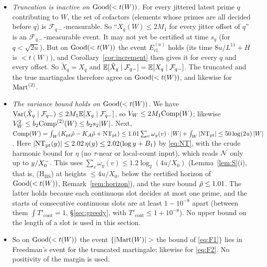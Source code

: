 \begin{itemize}
\item \emph{Truncation is inactive on $\mathrm{Good}(<t(W))$.} For every jittered latest prime $q$ contributing to $W$, the set of cofactors
  (elements whose primes are all decided before $q$) is $\mathcal F_{q-}$-measurable. So ``$X_q(W)\le2M_1$ for every jitter
  offset of $q$'' is an $\mathcal F_{q-}$-measurable event. It may not yet be certified at time $s_q$ (for $q<\sqrt{2u}$).
  But on $\mathrm{Good}(<t(W))$ the event $E_{\mathrm{cl}}^{(u)}$ holds (its time $8u/L^{11}+H$ is $<t(W)$), and
  Corollary~\ref{cor:increment} then gives it for every $q$ and every offset. So $\tilde X_q=X_q$ and
  $\mathbb{E}[\tilde X_q\mid\mathcal F_{q-}]=\mathbb{E}[X_q\mid\mathcal F_{q-}]$. The truncated and the true martingales therefore agree on
  $\mathrm{Good}(<t(W))$, and likewise for $\mathrm{Mart}^{(2)}$.
\item \emph{The variance bound holds on $\mathrm{Good}(<t(W))$.} We have
  $\mathrm{Var}(\tilde X_q\mid\mathcal F_{q-})\le2M_1\mathbb{E}[X_q\mid\mathcal F_{q-}]$, so $V_W\le2M_1\mathrm{Comp}(W)$; likewise
  $V^2_W\le b_2\mathrm{Comp}^{(2)}(W)\le b_2s_2|W|$. Next,
  $\mathrm{Comp}(W)=\int_W(K_{\mathrm{pt}}\tilde\rho-K_{\mathcal{A}}\tilde\rho+\mathrm{NT}_{\mathrm{pt}})\le1.01\sum_v\omega_y(v)\cdot|W|+\int_W|\mathrm{NT}_{\mathrm{pt}}|\le50\log(2u)\,|W|$.
  Here $|\mathrm{NT}_{\mathrm{pt}}(y)|\le2.02\,\eta(y)\le2.02(\log y+B_1)$ by \eqref{eq:NT}, with the crude harmonic bound for $\eta$ (no
  $\tau$-near or local-count input), which reads $\mathcal{N}$ only up to $y/X_0^{-}$.
  This uses $\sum_v\omega_y(v)\le1.2\log_2(4u/X_0)$ (Lemma~\ref{lem:S}(i), that is, \textup{(H$_{\mathrm{BS}}$)} at heights
  $\le4u/X_0$, below the certified horizon of $\mathrm{Good}(<t(W))$, Remark~\ref{rem:horizon}), and the sure bound $\tilde\rho\le1.01$. The latter holds because each continuous
  slot decides at most one prime, and the starts of consecutive continuous slots are at least $1-10^{-8}$ apart (between them
  $\int T'_{\mathrm{cont}}=1$, \S\ref{sec:greedy}, with $T'_{\mathrm{cont}}\le1+10^{-8}$). No upper bound on the length of a slot is used
  in this section.
\item So on $\mathrm{Good}(<t(W))$ the event $\{|\Mart(W)|>$ the bound of \eqref{eq:F1}$\}$ lies in Freedman's event for the
  truncated martingale; likewise for \eqref{eq:F2}. No positivity of the margin is used.
\end{itemize}

